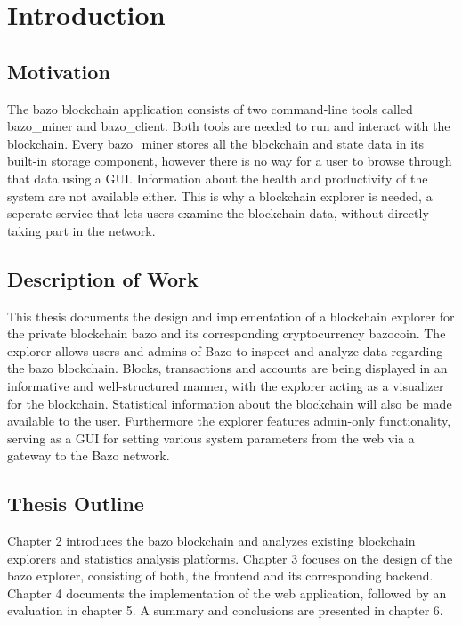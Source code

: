 \chapter{Introduction}

\section{Motivation}
The bazo blockchain application consists of two command-line tools called bazo{\_}miner and bazo{\_}client. Both tools are needed to run and interact with the blockchain. Every bazo{\_}miner stores all the blockchain and state data in its built-in storage component, however there is no way for a user to browse through that data using a GUI. Information about the health and productivity of the system are not available either. This is why a blockchain explorer is needed, a seperate service that lets users examine the blockchain data, without directly taking part in the network. 

\section{Description of Work}
This thesis documents the design and implementation of a blockchain explorer for the private blockchain bazo and its corresponding cryptocurrency bazocoin. The explorer allows users and admins of Bazo to inspect and analyze data regarding the bazo blockchain. Blocks, transactions and accounts are being displayed in an informative and well-structured manner, with the explorer acting as a visualizer for the blockchain. Statistical information about the blockchain will also be made available to the user. Furthermore the explorer features admin-only functionality, serving as a GUI for setting various system parameters from the web via a gateway to the Bazo network.

\section{Thesis Outline}
Chapter 2 introduces the bazo blockchain and analyzes existing blockchain explorers and statistics analysis platforms. Chapter 3 focuses on the design of the bazo explorer, consisting of both, the frontend and its corresponding backend. Chapter 4 documents the implementation of the web application, followed by an evaluation in chapter 5. A summary and conclusions are presented in chapter 6.